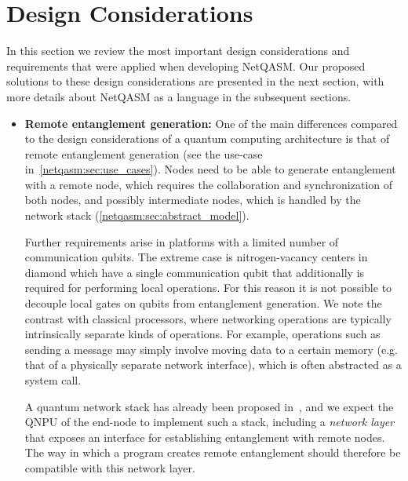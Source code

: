 \section{Design Considerations}
\label{netqasm:sec:design_considerations}
In this section we review the most important design considerations and requirements that were applied when
developing \ac{NetQASM}.
Our proposed solutions to these design considerations are presented in the next section, with more details about \ac{NetQASM} as a language
in the subsequent sections.

\begin{itemize}
      \item \label{item:design_ent_gen} \textbf{Remote entanglement generation:}
            One of the main differences compared to the design considerations of a quantum computing architecture is that of remote entanglement
            generation (see the use-case in~\cref{netqasm:sec:use_cases}).
            Nodes need to be able to generate entanglement with a remote node, which requires the collaboration and synchronization of both nodes, and possibly intermediate nodes, which is handled by the network stack (\cref{netqasm:sec:abstract_model}).

            Further requirements arise in platforms with a limited number of communication qubits.
            The extreme case is nitrogen-vacancy centers in diamond which have a single communication qubit that additionally is required for performing local operations.
            For this reason it is not possible to decouple local gates on qubits from entanglement
            generation.
            We note the contrast with classical processors, where networking operations are typically intrinsically separate kinds of operations.
            For example, operations such as sending a message may simply involve moving data to a certain memory (e.g. that of a physically separate network interface), which is often abstracted as a system call.

            A quantum network stack has already been proposed in~\cite{dahlberg2019linklayer,kozlowski2020networklayer}, and we expect the \ac{QNPU} of the end-node to implement such a stack, including a \textit{network layer} that exposes an interface for establishing entanglement with remote nodes.
            The way in which a program creates remote entanglement should therefore be compatible with this network layer.


\end{itemize}
